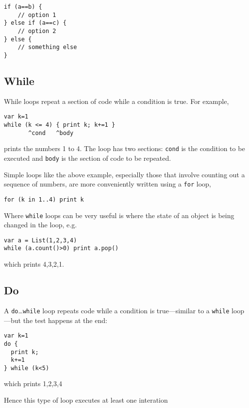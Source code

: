 \begin{lstlisting}
if (a==b) {
    // option 1
} else if (a==c) {
    // option 2
} else {
    // something else
}
\end{lstlisting}

\hypertarget{while}{%
\subsection{While}\label{while}}

While loops repeat a section of code while a condition is true. For
example,

\begin{lstlisting}
var k=1
while (k <= 4) { print k; k+=1 }
       ^cond   ^body
\end{lstlisting}

prints the numbers 1 to 4. The loop has two sections: \texttt{cond} is
the condition to be executed and \texttt{body} is the section of code to
be repeated.

Simple loops like the above example, especially those that involve
counting out a sequence of numbers, are more conveniently written using
a \texttt{for} loop,

\begin{lstlisting}
for (k in 1..4) print k
\end{lstlisting}

Where \texttt{while} loops can be very useful is where the state of an
object is being changed in the loop, e.g.

\begin{lstlisting}
var a = List(1,2,3,4)
while (a.count()>0) print a.pop()
\end{lstlisting}

which prints 4,3,2,1.

\hypertarget{do}{%
\subsection{Do}\label{do}}

A \texttt{do}\ldots{}\texttt{while} loop repeats code while a condition
is true---similar to a \texttt{while} loop---but the test happens at the
end:

\begin{lstlisting}
var k=1
do {
  print k;
  k+=1
} while (k<5)
\end{lstlisting}

which prints 1,2,3,4

Hence this type of loop executes at least one interation

